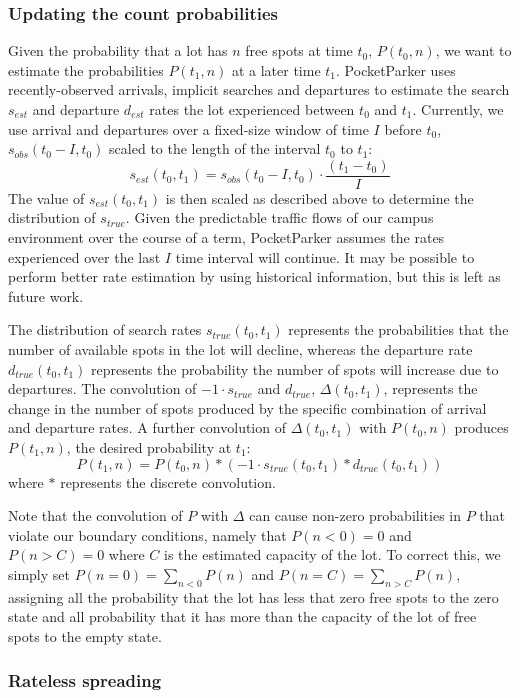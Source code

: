 \subsubsection{Updating the count probabilities}
Given the probability that a lot has $n$ free spots at time $t_0$, $P(t_0,
n)$, we want to estimate the probabilities $P(t_1, n)$ at a later time $t_1$.
PocketParker uses recently-observed arrivals, implicit searches and
departures to estimate the search $s_{est}$ and departure $d_{est}$ rates the
lot experienced between $t_0$ and $t_1$. Currently, we use arrival and
departures over a fixed-size window of time $I$ before $t_0$, $s_{obs}(t_0 -
I, t_0)$ scaled to the length of the interval $t_0$ to $t_1$:
%
\[s_{est}(t_0, t_1) = s_{obs}(t_0 - I, t_0) \cdot \frac{(t_1 - t_0)}{I} \]
%
The value of $s_{est}(t_0, t_1)$ is then scaled as described above to
determine the distribution of $s_{true}$.  Given the predictable traffic flows
of our campus environment over the course of a term, PocketParker assumes the
rates experienced over the last $I$ time interval will continue. It may be
possible to perform better rate estimation by using historical information,
but this is left as future work.

The distribution of search rates $s_{true}(t_0, t_1)$ represents the
probabilities that the number of available spots in the lot will decline,
whereas the departure rate $d_{true}(t_0, t_1)$ represents the probability
the number of spots will increase due to departures. The convolution of $-1
\cdot s_{true}$ and $d_{true}$, $\Delta(t_0, t_1)$, represents the change in
the number of spots produced by the specific combination of arrival and
departure rates. A further convolution of $\Delta(t_0, t_1)$ with $P(t_0,
n)$ produces $P(t_1, n)$, the desired probability at $t_1$:
%
\[ P(t_1, n) = P(t_0, n) * (-1 \cdot s_{true}(t_0, t_1) * d_{true}(t_0,
t_1)) \]
%
where $*$ represents the discrete convolution.

Note that the convolution of $P$ with $\Delta$ can cause non-zero
probabilities in $P$ that violate our boundary conditions, namely that
$P(n < 0) = 0$ and $P(n > C) = 0$ where $C$ is the estimated capacity of
the lot. To correct this, we simply set $P(n = 0) = \sum_{n < 0} P(n)$
and $P(n = C) = \sum_{n > C} P(n)$, assigning all the probability that
the lot has less that zero free spots to the zero state and all probability
that it has more than the capacity of the lot of free spots to the empty
state.

\subsubsection{Rateless spreading}

